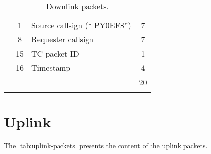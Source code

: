 \begin{longtable}[c]{lcL{0.4\textwidth}c}
                                            & 1  & Source callsign (`` PY0EFS'')        & 7 \\
                                            & 8  & Requester callsign                   & 7 \\
                                            & 15 & TC packet ID                         & 1 \\
                                            & 16 & Timestamp                            & 4 \\
                                            &    &                                      & 20 \\
    \bottomrule[1.5pt]
    \caption{Downlink packets.}
    \label{tab:downlink-packets}
\end{longtable}

\section{Uplink}

The \autoref{tab:uplink-packets} presents the content of the uplink packets.

